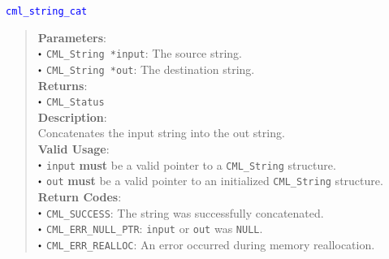 \documentclass[a4paper,oneside,8pt]{extarticle}
\newcommand{\function}[1]{
  \noindent\textcolor{blue}{\texttt{#1}}
  \vspace{-0.3em}
}
\renewcommand{\dot}{\raisebox{0.3ex}{\scalebox{0.6}{$\bullet$}}}
\theoremstyle{definition}
\begin{document}
\function{cml\_string\_cat}
\begin{quote}
  \textbf{Parameters}: \\
  $\dot$ \texttt{CML\_String *input}: The source string. \\
  $\dot$ \texttt{CML\_String *out}: The destination string. \\
  \textbf{Returns}: \\
  $\dot$ \texttt{CML\_Status} \\

  \vspace{-0.75em}
  \textbf{Description}: \\
  Concatenates the input string into the out string. \\

  \vspace{-0.75em}
  \textbf{Valid Usage}: \\
  $\dot$ \texttt{input} \textbf{must} be a valid pointer to a \texttt{CML\_String} structure. \\
  $\dot$ \texttt{out} \textbf{must} be a valid pointer to an initialized \texttt{CML\_String} structure. \\

  \vspace{-0.75em}
  \textbf{Return Codes}: \\
  $\dot$ \texttt{CML\_SUCCESS}: The string was successfully concatenated. \\
  $\dot$ \texttt{CML\_ERR\_NULL\_PTR}: \texttt{input} or \texttt{out} was \texttt{NULL}. \\
  $\dot$ \texttt{CML\_ERR\_REALLOC}: An error occurred during memory reallocation. \\
\end{quote}
\end{document}

